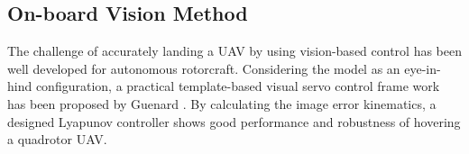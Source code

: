 %
%

\subsection{On-board Vision Method}
The challenge of accurately landing a UAV by using vision-based control has been well developed for autonomous rotorcraft. Considering the model as an eye-in-hind configuration, a practical template-based visual servo control frame work has been proposed by Guenard \cite{Guenard2008}. By calculating the image error kinematics, a designed Lyapunov controller shows good performance and robustness of hovering a quadrotor UAV. 


